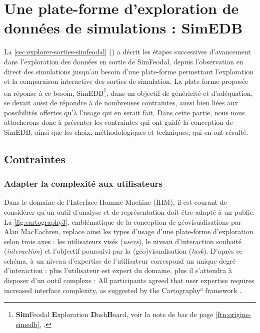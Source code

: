 \clearpage
\section[Une plate-forme d'exploration de données de simulations : SimEDB]{Une plate-forme d'exploration de données de simulations : SimEDB%
 }\label{sec:SimEDB}

La \cref{sec:explorer-sorties-simfeodal} () a décrit les étapes successives d'avancement dans l'exploration des données en sortie de SimFeodal, depuis l'observation en direct des simulations jusqu'au besoin d'une plate-forme permettant l'exploration et la comparaison interactive des sorties de simulation.
La plate-forme proposée en réponse à ce besoin, SimEDB\footnote{
	\textbf{Sim}Feodal \textbf{E}xploration \textbf{D}ash\textbf{B}oard, voir la note de bas de page \ref{ftn:origine-simedb}, .
}, dans un objectif de généricité et d'adéquation, se devait aussi de répondre à de nombreuses contraintes, aussi bien liées aux possibilités offertes qu'à l'usage qui en serait fait.
Dans cette partie, nous nous attacherons donc à présenter les contraintes qui ont guidé la conception de SimEDB, ainsi que les choix, méthodologiques et techniques, qui en ont résulté.

	\subsection{Contraintes}

		\subsubsection{Adapter la complexité aux utilisateurs}

			Dans le domaine de l'Interface Homme-Machine (IHM), il est courant de considérer qu'un outil d'analyse et de représentation doit être adapté à un public. La \cref{fig:cartography3}, emblématique de la conception de géovisualisations par Alan MacEachren, replace ainsi les types d'usage d'une plate-forme d'exploration selon trois axes : les utilisateurs visés (\textit{users}), le niveau d'interaction souhaité (\textit{interaction}) et l'objectif poursuivi par la (géo)visualisation (\textit{task}).
			D'après ce schéma, à un niveau d'expertise de l'utilisateur correspond un unique degré d'interaction : plus l'utilisateur est expert du domaine, plus il s'attendra à disposer d'un outil complexe : \og All participants agreed that user expertise requires increased interface complexity, as suggested by the Cartography³ framework\fg{} \autocite[16]{roth_interactivity_2015}.

